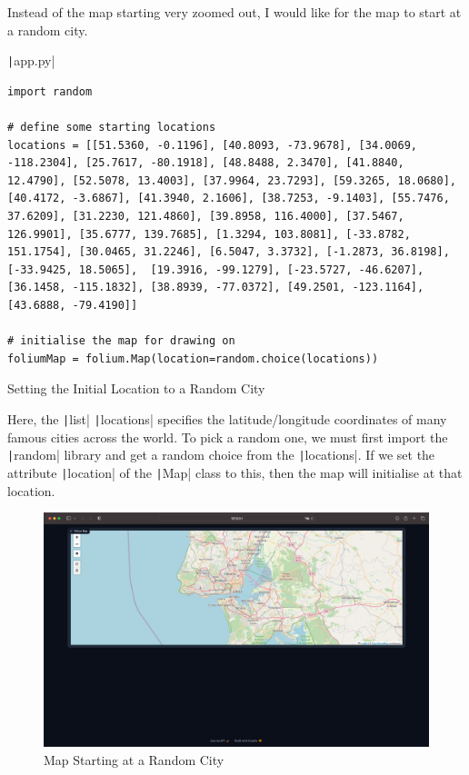\documentclass[12pt]{report}
\newcommand{\pil}[1]{\protect\texttt|#1|}
\begin{document}
Instead of the map starting very zoomed out, I would like for the map to start at a random city.

\begin{listing}[H]
\pil{app.py}
\begin{verbatim}
import random

# define some starting locations
locations = [[51.5360, -0.1196], [40.8093, -73.9678], [34.0069, -118.2304], [25.7617, -80.1918], [48.8488, 2.3470], [41.8840, 12.4790], [52.5078, 13.4003], [37.9964, 23.7293], [59.3265, 18.0680], [40.4172, -3.6867], [41.3940, 2.1606], [38.7253, -9.1403], [55.7476, 37.6209], [31.2230, 121.4860], [39.8958, 116.4000], [37.5467, 126.9901], [35.6777, 139.7685], [1.3294, 103.8081], [-33.8782, 151.1754], [30.0465, 31.2246], [6.5047, 3.3732], [-1.2873, 36.8198], [-33.9425, 18.5065],  [19.3916, -99.1279], [-23.5727, -46.6207], [36.1458, -115.1832], [38.8939, -77.0372], [49.2501, -123.1164], [43.6888, -79.4190]]

# initialise the map for drawing on
foliumMap = folium.Map(location=random.choice(locations))
\end{verbatim}
\caption{Setting the Initial Location to a Random City}\label{cs:randomCity}
\end{listing}

Here, the \pil{list} \pil{locations} specifies the latitude/longitude coordinates of many famous cities across the world. To pick a random one, we must first import the \pil{random} library and get a random choice from the \pil{locations}. If we set the attribute \pil{location} of the \pil{Map} class to this, then the map will initialise at that location.

\begin{figure}[H]
\centering
\includegraphics[width=14cm]{ss11.5.png}
\caption{Map Starting at a Random City}\label{fig:ss11.5}
\end{figure}
\end{document}
